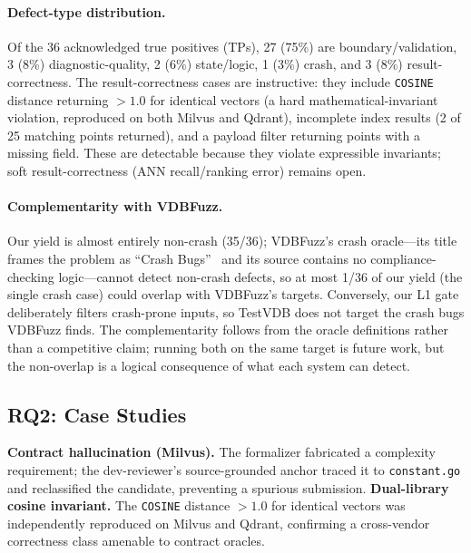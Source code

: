 \documentclass[sigconf, anonymous, review]{acmart}
\begin{document}
\paragraph{Defect-type distribution.} Of the 36 acknowledged true positives (TPs), 27 (75\%) are boundary/validation, 3 (8\%) diagnostic-quality, 2 (6\%) state/logic, 1 (3\%) crash, and 3 (8\%) result-correctness. The result-correctness cases are instructive: they include \texttt{COSINE} distance returning $>1.0$ for identical vectors (a hard mathematical-invariant violation, reproduced on both Milvus and Qdrant), incomplete index results (2 of 25 matching points returned), and a payload filter returning points with a missing field. These are detectable because they violate expressible invariants; soft result-correctness (ANN recall/ranking error) remains open.

\paragraph{Complementarity with VDBFuzz.} Our yield is almost entirely non-crash (35/36); VDBFuzz's crash oracle---its title frames the problem as ``Crash Bugs''~\cite{vdbfuzz26} and its source contains no compliance-checking logic---cannot detect non-crash defects, so at most 1/36 of our yield (the single crash case) could overlap with VDBFuzz's targets. Conversely, our L1 gate deliberately filters crash-prone inputs, so TestVDB does not target the crash bugs VDBFuzz finds. The complementarity follows from the oracle definitions rather than a competitive claim; running both on the same target is future work, but the non-overlap is a logical consequence of what each system can detect.

\subsection{RQ2: Case Studies}
\textbf{Contract hallucination (Milvus).} The formalizer fabricated a complexity requirement; the dev-reviewer's source-grounded anchor traced it to \texttt{constant.go} and reclassified the candidate, preventing a spurious submission.
\textbf{Dual-library cosine invariant.} The \texttt{COSINE} distance $>1.0$ for identical vectors was independently reproduced on Milvus and Qdrant, confirming a cross-vendor correctness class amenable to contract oracles.
\end{document}
